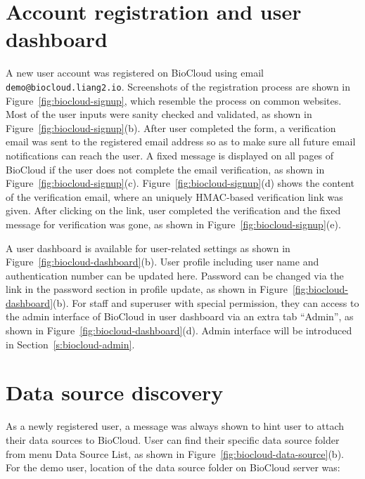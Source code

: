 \section{Account registration and user dashboard}

A new user account was registered on BioCloud using email
\texttt{demo@biocloud.liang2.io}. Screenshots of the registration process are
shown in Figure~\ref{fig:biocloud-signup}, which resemble the process on common
websites. Most of the user inputs were sanity checked and validated, as shown
in Figure~\ref{fig:biocloud-signup}(b). After user completed the form, a
verification email was sent to the registered email address so as to make sure
all future email notifications can reach the user. A fixed message is displayed
on all pages of BioCloud if the user does not complete the email verification,
as shown in Figure~\ref{fig:biocloud-signup}(c).
Figure~\ref{fig:biocloud-signup}(d) shows the content of the verification
email, where an uniquely HMAC-based verification link was given. After clicking
on the link, user completed the verification and the fixed message for
verification was gone, as shown in Figure~\ref{fig:biocloud-signup}(e).



A user dashboard is available for user-related settings as shown in
Figure~\ref{fig:biocloud-dashboard}(b). User profile including user name and
authentication number can be updated here. Password can be changed via the link
in the password section in profile update, as shown in
Figure~\ref{fig:biocloud-dashboard}(b). For staff and superuser with special
permission, they can access to the admin interface of BioCloud in user
dashboard via an extra tab ``Admin'', as shown in
Figure~\ref{fig:biocloud-dashboard}(d). Admin interface will be introduced in
Section~\ref{s:biocloud-admin}.





\section{Data source discovery}

As a newly registered user, a message was always shown to hint user to attach
their data sources to BioCloud. User can find their specific data source folder
from menu Data Source \textrightarrow List, as shown in
Figure~\ref{fig:biocloud-data-source}(b). For the demo user, location of the
data source folder on BioCloud server was:

